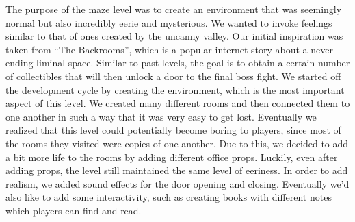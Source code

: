 \documentclass{vgtc}                          %
\begin{document}
The purpose of the maze level was to create an environment that was seemingly normal but also incredibly eerie and mysterious. We wanted to invoke feelings similar to that of ones created by the uncanny valley. Our initial inspiration was taken from “The Backrooms”, which is a popular internet story about a never ending liminal space. Similar to past levels, the goal is to obtain a certain number of collectibles that will then unlock a door to the final boss fight. We started off the development cycle by creating the environment, which is the most important aspect of this level. We created many different rooms and then connected them to one another in such a way that it was very easy to get lost. Eventually we realized that this level could potentially become boring to players, since most of the rooms they visited were copies of one another. Due to this, we decided to add a bit more life to the rooms by adding different office props. Luckily, even after adding props, the level still maintained the same level of eeriness. In order to add realism, we added sound effects for the door opening and closing. Eventually we’d also like to add some interactivity, such as creating books with different notes which players can find and read. 
\end{document}
